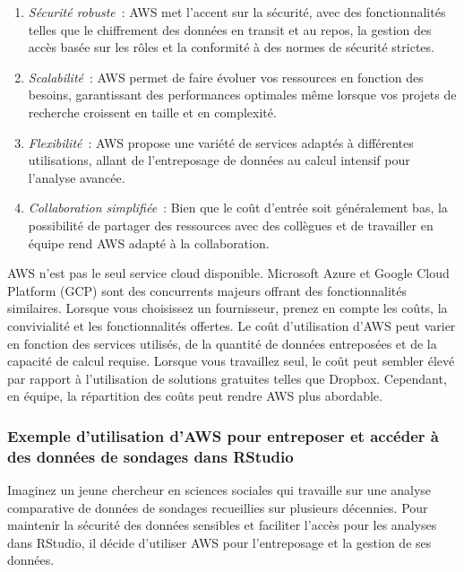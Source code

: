 \documentclass[
  letterpaper,
]{scrbook}
\begin{document}
\begin{enumerate}
\def\labelenumi{\arabic{enumi}.}
\item
  \emph{Sécurité robuste}~: AWS met l'accent sur la sécurité, avec des
  fonctionnalités telles que le chiffrement des données en transit et au
  repos, la gestion des accès basée sur les rôles et la conformité à des
  normes de sécurité strictes.
\item
  \emph{Scalabilité}~: AWS permet de faire évoluer vos ressources en
  fonction des besoins, garantissant des performances optimales même
  lorsque vos projets de recherche croissent en taille et en complexité.
\item
  \emph{Flexibilité}~: AWS propose une variété de services adaptés à
  différentes utilisations, allant de l'entreposage de données au calcul
  intensif pour l'analyse avancée.
\item
  \emph{Collaboration simplifiée}~: Bien que le coût d'entrée soit
  généralement bas, la possibilité de partager des ressources avec des
  collègues et de travailler en équipe rend AWS adapté à la
  collaboration.
\end{enumerate}

AWS n'est pas le seul service cloud disponible. Microsoft Azure et
Google Cloud Platform (GCP) sont des concurrents majeurs offrant des
fonctionnalités similaires. Lorsque vous choisissez un fournisseur,
prenez en compte les coûts, la convivialité et les fonctionnalités
offertes. Le coût d'utilisation d'AWS peut varier en fonction des
services utilisés, de la quantité de données entreposées et de la
capacité de calcul requise. Lorsque vous travaillez seul, le coût peut
sembler élevé par rapport à l'utilisation de solutions gratuites telles
que Dropbox. Cependant, en équipe, la répartition des coûts peut rendre
AWS plus abordable.

\hypertarget{exemple-dutilisation-daws-pour-entreposer-et-accuxe9der-uxe0-des-donnuxe9es-de-sondages-dans-rstudio}{%
\subsubsection{Exemple d'utilisation d'AWS pour entreposer et accéder à
des données de sondages dans
RStudio}\label{exemple-dutilisation-daws-pour-entreposer-et-accuxe9der-uxe0-des-donnuxe9es-de-sondages-dans-rstudio}}

Imaginez un jeune chercheur en sciences sociales qui travaille sur une
analyse comparative de données de sondages recueillies sur plusieurs
décennies. Pour maintenir la sécurité des données sensibles et faciliter
l'accès pour les analyses dans RStudio, il décide d'utiliser AWS pour
l'entreposage et la gestion de ses données.
\end{document}
